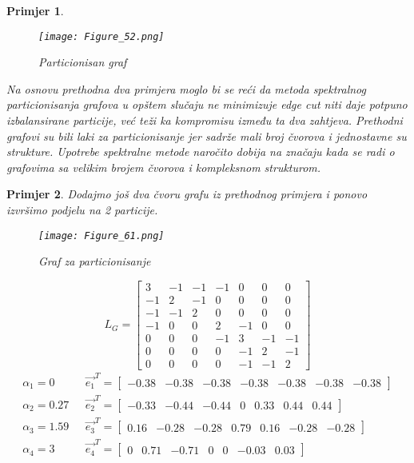 \documentclass[11pt]{article}
\newtheorem{example}{Primjer}
\begin{document}
\begin{example}
					\begin{figure}[h]
						\centering
						\texttt{[image: Figure\_52.png]}
						\caption{Particionisan graf}
					\end{figure}
					Na osnovu prethodna dva primjera moglo bi se reći da metoda spektralnog particionisanja grafova u opštem slučaju ne minimizuje edge cut niti daje potpuno izbalansirane particije, već teži ka kompromisu između ta dva zahtjeva.
					Prethodni grafovi su bili laki za particionisanje jer sadrže mali broj čvorova i jednostavne su strukture. Upotrebe spektralne metode naročito dobija na značaju kada se radi o grafovima sa velikim brojem čvorova i kompleksnom strukturom. 
				\end{example}
				\newpage
				\begin{example}
					Dodajmo još dva čvoru grafu iz prethodnog primjera i ponovo izvršimo podjelu na 2 particije.
					\begin{figure}[h]
						\centering
						\texttt{[image: Figure\_61.png]}
						\caption{Graf za particionisanje}
					\end{figure}
					
					\[ 
						L_G =
			\begin{bmatrix}
				 3 &-1 &-1 &-1 & 0 & 0 & 0 \\ 
				-1 & 2 &-1 & 0 & 0 & 0 & 0 \\
				-1 &-1 & 2 & 0 & 0 & 0 & 0 \\
				-1 & 0 & 0 & 2 &-1 & 0 & 0 \\
				 0 & 0 & 0 &-1 & 3 &-1 &-1 \\
				 0 & 0 & 0 & 0 &-1 & 2 &-1 \\
				 0 & 0 & 0 & 0 &-1 &-1 & 2
			\end{bmatrix}
		\]
		\[
			\begin{split}
				\alpha_1=0 \texttt{~~~~} & \vec{e_1}^T = \begin{bmatrix} -0.38& -0.38& -0.38& -0.38& -0.38& -0.38& -0.38      \end{bmatrix} \\ 
				\alpha_2=0.27 \texttt{~~} & \vec{e_2}^T = \begin{bmatrix} -0.33& -0.44& -0.44& 0& 0.33& 0.44& 0.44  \end{bmatrix} \\ 
				\alpha_3=1.59 \texttt{~~} & \vec{e_3}^T = \begin{bmatrix} 0.16& -0.28& -0.28& 0.79& 0.16& -0.28& -0.28                 \end{bmatrix} \\
				\alpha_4=3 \texttt{~~~~} & \vec{e_4}^T = \begin{bmatrix} 0& 0.71& -0.71& 0& 0& -0.03& 0.03   \end{bmatrix} \\
			\end{split}
		\]


\end{example}
\end{document}
